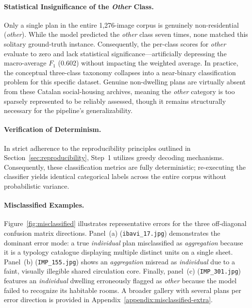 \documentclass[12pt,a4paper,openright]{report}
\begin{document}
\paragraph{Statistical Insignificance of the \textit{Other} Class.} Only a single plan in the entire 1,276-image corpus is genuinely non-residential (\textit{other}). While the model predicted the \textit{other} class seven times, none matched this solitary ground-truth instance. Consequently, the per-class scores for \textit{other} evaluate to zero and lack statistical significance---artificially depressing the macro-average $F_1$ (0.602) without impacting the weighted average. In practice, the conceptual three-class taxonomy collapses into a near-binary classification problem for this specific dataset. Genuine non-dwelling plans are virtually absent from these Catalan social-housing archives, meaning the \textit{other} category is too sparsely represented to be reliably assessed, though it remains structurally necessary for the pipeline's generalizability.

\paragraph{Verification of Determinism.} In strict adherence to the reproducibility principles outlined in Section~\ref{sec:reproducibility}, Step~1 utilizes greedy decoding mechanisms. Consequently, these classification metrics are fully deterministic; re-executing the classifier yields identical categorical labels across the entire corpus without probabilistic variance.

\paragraph{Misclassified Examples.} Figure~\ref{fig:misclassified} illustrates representative errors for the three off-diagonal confusion matrix directions. Panel~(a) (\texttt{ibavi\_17.jpg}) demonstrates the dominant error mode: a true \textit{individual} plan misclassified as \textit{aggregation} because it is a typology catalogue displaying multiple distinct units on a single sheet. Panel~(b) (\texttt{IMP\_155.jpg}) shows an \textit{aggregation} misread as \textit{individual} due to a faint, visually illegible shared circulation core. Finally, panel~(c) (\texttt{IMP\_301.jpg}) features an \textit{individual} dwelling erroneously flagged as \textit{other} because the model failed to recognize its habitable rooms. A broader gallery with several plans per error direction is provided in Appendix~\ref{appendix:misclassified-extra}.
\end{document}
